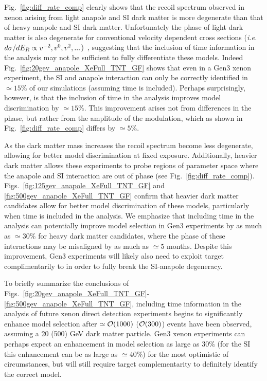 \documentclass[11pt]{article}
\newcommand{\ie}{{\it i.e.~}}  \newcommand{\eg}{{\it e.g.~}}
\newcommand{\Fig}[1]{Fig.~\ref{#1}} \newcommand{\Figs}[2]{Figs.~\ref{#1} and \ref{#2}}
\begin{document}
\Fig{fig:diff_rate_comp} clearly shows that the recoil spectrum observed in xenon arising from light anapole and SI dark matter is more degenerate than that of heavy anapole and SI dark matter. Unfortunately the phase of light dark matter is also degenerate for conventional velocity dependent cross sections (\ie $d\sigma/dE_R \propto v^{-2}, v^0, v^2, ...$)~\cite{DelNobile:2015tza,DelNobile:2015rmp}, suggesting that the inclusion of time information in the analysis may not be sufficient to fully differentiate these models. Indeed \Fig{fig:20gev_anapole_XeFull_TNT_GF} shows that even in a Gen3 xenon experiment, the SI and anapole interaction can only be correctly identified in $\simeq 15\%$ of our simulations (assuming time is included). Perhaps surprisingly, however, is that the inclusion of time in the analysis improves model discrimination by $\simeq 15\%$. This improvement arises not from differences in the phase, but rather from the amplitude of the modulation, which as shown in \Fig{fig:diff_rate_comp} differs by $\simeq 5\%$.



As the dark matter mass increases the recoil spectrum become less degenerate, allowing for better model discrimination at fixed exposure. Additionally, heavier dark matter allows these experiments to probe regions of parameter space where the anapole and SI interaction are out of phase (see \Fig{fig:diff_rate_comp}). Figs.~\ref{fig:125gev_anapole_XeFull_TNT_GF} and \ref{fig:500gev_anapole_XeFull_TNT_GF} confirm that heavier dark matter candidates allow for better model discrimination of these models, particularly when time is included in the analysis. We emphasize that including time in the analysis can potentially improve model selection in Gen3 experiments by as much as $\simeq 30\%$ for heavy dark matter candidates, where the phase of these interactions may be misaligned by as much as $\simeq 5$ months. Despite this improvement, Gen3 experiments will likely also need to exploit target complimentarily to in order to fully break the SI-anapole degeneracy. 

To briefly summarize the conclusions of Figs.~\ref{fig:20gev_anapole_XeFull_TNT_GF}-\ref{fig:500gev_anapole_XeFull_TNT_GF}, including time information in the analysis of future xenon direct detection experiments begins to significantly enhance model selection after $\simeq {\cal O}(1000)$ ($ {\cal O}(300)$) events have been observed, assuming a 20 (500) GeV dark matter particle. Gen3 xenon experiments can perhaps expect an enhancement in model selection as large as $30\%$ (for the SI this enhancement can be as large as $\simeq 40\%$) for the most optimistic of circumstances, but will still require target complementarity to definitely identify the correct model.  
\end{document}
